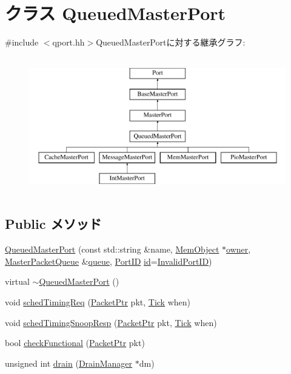 \hypertarget{classQueuedMasterPort}{
\section{クラス QueuedMasterPort}
\label{classQueuedMasterPort}
}


{\ttfamily \#include $<$qport.hh$>$}QueuedMasterPortに対する継承グラフ:\begin{figure}[H]
\begin{center}
\leavevmode
\includegraphics[height=6cm]{classQueuedMasterPort}
\end{center}
\end{figure}
\subsection*{Public メソッド}
\begin{DoxyCompactItemize}
\item 
\hyperlink{classQueuedMasterPort_afe8cac63edc9b33614a9c9c7d67b1103}{QueuedMasterPort} (const std::string \&name, \hyperlink{classMemObject}{MemObject} $\ast$\hyperlink{classPort_aba966efb6c1df4b015be3a396df6c318}{owner}, \hyperlink{classMasterPacketQueue}{MasterPacketQueue} \&\hyperlink{classQueuedMasterPort_ae4e2ec83c21e5a331cecc31d84b2dbb7}{queue}, \hyperlink{base_2types_8hh_acef4d7d41cb21fdc252e20c04cd7bb8e}{PortID} \hyperlink{classPort_a0a67444fc1c33a60fe4a92bfff05d0cb}{id}=\hyperlink{base_2types_8hh_a65bf40f138cf863f0c5e2d8ca1144126}{InvalidPortID})
\item 
virtual \hyperlink{classQueuedMasterPort_aa4385651aa180db02c719e125fc63881}{$\sim$QueuedMasterPort} ()
\item 
void \hyperlink{classQueuedMasterPort_a6e835b0c02fcb4679fc14de7605b4f13}{schedTimingReq} (\hyperlink{classPacket}{PacketPtr} pkt, \hyperlink{base_2types_8hh_a5c8ed81b7d238c9083e1037ba6d61643}{Tick} when)
\item 
void \hyperlink{classQueuedMasterPort_aedc38469f895c00a0ffcb993598b7a53}{schedTimingSnoopResp} (\hyperlink{classPacket}{PacketPtr} pkt, \hyperlink{base_2types_8hh_a5c8ed81b7d238c9083e1037ba6d61643}{Tick} when)
\item 
bool \hyperlink{classQueuedMasterPort_a8eb60d4744b6212ad749f3a586759266}{checkFunctional} (\hyperlink{classPacket}{PacketPtr} pkt)
\item 
unsigned int \hyperlink{classQueuedMasterPort_aa8a18d230dba7a674ac8a0b4f35bc36a}{drain} (\hyperlink{classDrainManager}{DrainManager} $\ast$dm)
\end{DoxyCompactItemize}
